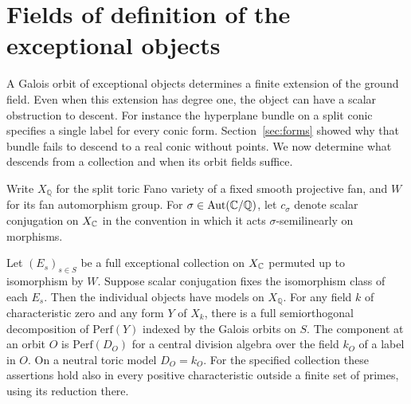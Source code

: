 \section{Fields of definition of the exceptional objects}\label{sec:fieldmodels}

A Galois orbit of exceptional objects determines a finite extension of the ground field. Even when this extension has degree one, the object can have a scalar obstruction to descent. For instance the hyperplane bundle on a split conic specifies a single label for every conic form. Section~\ref{sec:forms} showed why that bundle fails to descend to a real conic without points. We now determine what descends from a collection and when its orbit fields suffice.

Write $X_{\mathbb Q}$ for the split toric Fano variety of a fixed smooth projective fan, and $W$ for its fan automorphism group. For $\sigma\in\mathrm{Aut}(\mathbb C/\mathbb Q)$, let $c_\sigma$ denote scalar conjugation on $X_{\mathbb C}$ in the convention in which it acts $\sigma$-semilinearly on morphisms.

\begin{proposition}\label{prop:rationalobjects}
Let $(E_s)_{s\in S}$ be a full exceptional collection on $X_{\mathbb C}$ permuted up to isomorphism by $W$. Suppose scalar conjugation fixes the isomorphism class of each $E_s$. Then the individual objects have models on $X_{\mathbb Q}$. For any field $k$ of characteristic zero and any form $Y$ of $X_k$, there is a full semiorthogonal decomposition of $\mathrm{Perf}(Y)$ indexed by the Galois orbits on $S$. The component at an orbit $O$ is $\mathrm{Perf}(D_O)$ for a central division algebra over the field $k_O$ of a label in $O$. On a neutral toric model $D_O=k_O$. For the specified collection these assertions hold also in every positive characteristic outside a finite set of primes, using its reduction there.
\end{proposition}

